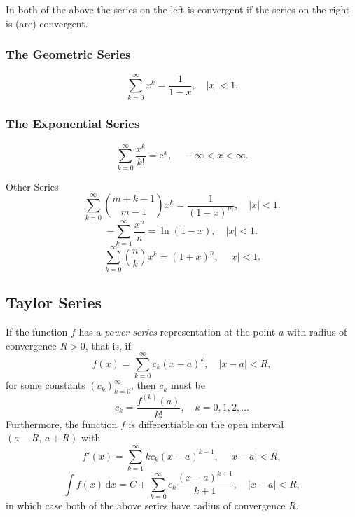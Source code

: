 \documentclass[captions=tableheading]{scrbook}
\begin{document}
\begin{example}
In both of the above the series on the left is convergent if the series on the right is (are) convergent.
\subsubsection{The Geometric Series}
\label{sec-21-3-3-1}

\begin{equation}
\sum_{k=0}^{\infty} x^{k} = \frac{1}{1 - x},\quad|x| < 1.\label{eq-geom-series}
\end{equation}
\subsubsection{The Exponential Series}
\label{sec-21-3-3-2}

\begin{equation}
\sum_{k=0}^{\infty}\frac{x^{k}}{k!} = \mathrm{e}^{x},\quad -\infty < x < \infty. \label{eq-exp-series}
\end{equation}

Other Series
\begin{equation}
\sum_{k=0}^{\infty}{m+k-1 \choose m-1}x^{k}=\frac{1}{(1-x)^{m}},\quad|x|<1.\label{eq-negbin-series}
\end{equation}
\begin{equation}
-\sum_{k=1}^{\infty}\frac{x^{n}}{n}=\ln(1-x),\quad|x|<1.\label{eq-log-series}
\end{equation}
\begin{equation}
\sum_{k=0}^{\infty}{n \choose k}x^{k}=(1+x)^{n},\quad|x|<1.\label{eq-binom-series-infinite}
\end{equation}
\subsection{Taylor Series}
\label{sec-21-3-4}


If the function \(f\) has a \emph{power series} representation at the point \(a\) with radius of convergence \(R>0\), that is, if
\begin{equation}
f(x)=\sum_{k=0}^{\infty}c_{k}(x-a)^{k},\quad|x-a|<R,
\end{equation}
for some constants \(\left(c_{k}\right)_{k=0}^{\infty}\), then \(c_{k}\) must be
\begin{equation}
c_{k}=\frac{f^{(k)}(a)}{k!},\quad k=0,1,2,\ldots
\end{equation}
Furthermore, the function \(f\) is differentiable on the open interval \((a-R,\, a+R)\) with
\begin{equation}
f'(x)=\sum_{k=1}^{\infty}kc_{k}(x-a)^{k-1},\quad|x-a|<R,
\end{equation}
\begin{equation}
\int f(x)\,\mathrm{d} x=C+\sum_{k=0}^{\infty}c_{k}\frac{(x-a)^{k+1}}{k+1},\quad|x-a|<R,
\end{equation}
in which case both of the above series have radius of convergence \(R\).

\end{example}
\end{document}
